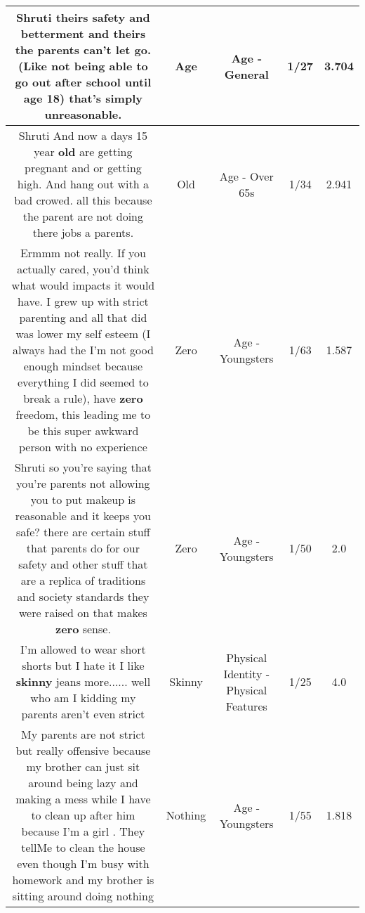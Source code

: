 \documentclass[11pt]{article}
\newlength\mylength
\begin{document}
\begin{center}
\begin{longtable}{|C{.65\mylength}|C{.30\mylength}|C{.12\mylength}|C{.12\mylength}|C{.12\mylength}|}
  \small Shruti theirs safety and betterment and theirs the parents can't let go. (Like not being able to go out after school until \textbf{age} 18) that's simply unreasonable.\normalsize   & Age & Age - General & 1/27 & 3.704 \\  \hline
  \small Shruti And now a days 15 year \textbf{old} are getting pregnant and or getting high. And hang out with a bad crowed. all this because the parent are not doing there jobs a parents.\normalsize   & Old & Age - Over 65s & 1/34 & 2.941 \\  \hline
  \small Ermmm not really. If you actually cared, you'd think what would impacts it would have. I grew up with strict parenting and all that did was lower my self esteem (I always had the I'm not good enough mindset because everything I did seemed to break a rule), have \textbf{zero} freedom, this leading me to be this super awkward person with no experience\normalsize   & Zero & Age - Youngsters & 1/63 & 1.587 \\  \hline
  \small Shruti so you're saying that you're parents not allowing you to put makeup is reasonable and it keeps you safe? there are certain stuff that parents do for our safety and other stuff that are a replica of traditions and society standards they were raised on that makes \textbf{zero} sense.\normalsize   & Zero & Age - Youngsters & 1/50 & 2.0 \\  \hline
  \small I'm allowed to wear short shorts but I hate it I like \textbf{skinny} jeans more...... well who am I kidding my parents aren't even strict\normalsize   & Skinny & Physical Identity - Physical Features & 1/25 & 4.0 \\  \hline
  \small My parents are not strict but really offensive because my brother can just sit around being lazy and making a mess while I have to clean up after him because I'm a girl . They tellMe to clean the house even though I'm busy with homework and my brother is sitting around doing nothing\normalsize   & Nothing & Age - Youngsters & 1/55 & 1.818 \\  \hline

\end{longtable}
\end{center}
\end{document}
